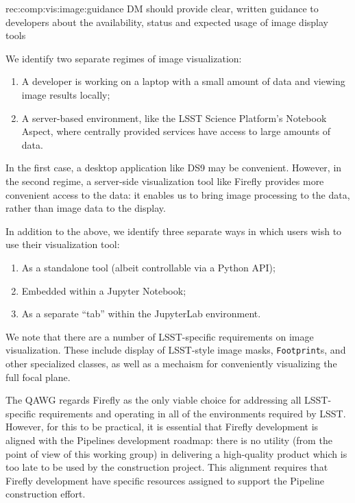 \begin{recommendation}
  {rec:comp:vis:image:guidance}
  {DM should provide clear, written guidance to developers about the availability, status and expected usage of image display tools}
\end{recommendation}

We identify two separate regimes of image visualization:

\begin{enumerate}

  \item{A developer is working on a laptop with a small amount of data and viewing image results locally;}
  \item{A server-based environment, like the LSST Science Platform's Notebook Aspect, where centrally provided services have access to large amounts of data.}

\end{enumerate}

In the first case, a desktop application like DS9 may be convenient.
However, in the second regime, a server-side visualization tool like Firefly provides more convenient access to the data: it enables us to bring image processing to the data, rather than image data to the display.

In addition to the above, we identify three separate ways in which users wish to use their visualization tool:

\begin{enumerate}

  \item{As a standalone tool (albeit controllable via a Python API);}
  \item{Embedded within a Jupyter Notebook;}
  \item{As a separate ``tab'' within the JupyterLab environment.}

\end{enumerate}

We note that there are a number of LSST-specific requirements on image visualization.
These include display of LSST-style image masks, \texttt{Footprint}s, and other specialized classes, as well as a mechaism for conveniently visualizing the full focal plane.

The QAWG regards Firefly as the only viable choice for addressing all LSST-specific requirements and operating in all of the environments required by LSST.
However, for this to be practical, it is essential that Firefly development is aligned with the Pipelines development roadmap: there is no utility (from the point of view of this working group) in delivering a high-quality product which is too late to be used by the construction project.
This alignment requires that Firefly development have specific resources assigned to support the Pipeline construction effort.

